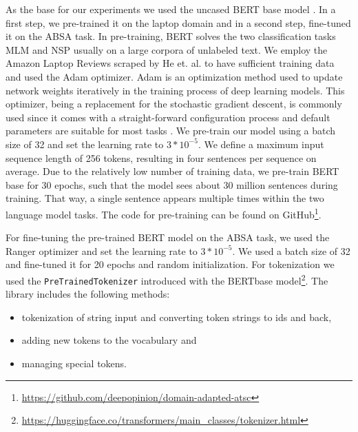 As the base for our experiments we used the uncased BERT base model \cite{DBLP:journals/corr/abs-1810-04805}. In a first step, we pre-trained it on the laptop domain and in a second step, fine-tuned it on the ABSA task. In pre-training, BERT solves the two classification tasks MLM and NSP usually on a large corpora of unlabeled text. We employ the Amazon Laptop Reviews scraped by He et. al. to have sufficient training data \cite{he2016ups} and used the Adam optimizer. Adam is an optimization method used to update network weights iteratively in the training process of deep learning models. This optimizer, being a replacement for the stochastic gradient descent, is commonly used since it comes with a straight-forward configuration process and default parameters are suitable for most tasks \cite{kingma2014adam}. We pre-train our model using a batch size of 32 and set the learning rate to $3 * 10^{-5}$.
We define a maximum input sequence length of 256 tokens, resulting in four sentences per sequence on average.  Due to the relatively low number of training data, we pre-train BERT base for 30 epochs, such that the model sees about 30 million sentences during training. That way, a single sentence appears multiple times within the two language model tasks. The code for pre-training can be found on GitHub\footnote{\url{https://github.com/deepopinion/domain-adapted-atsc}}.

For fine-tuning the pre-trained BERT model on the ABSA task, we used the Ranger optimizer and set the learning rate to $3 * 10^{-5}$.  We used a batch size of 32 and fine-tuned it for 20 epochs and random initialization. 
For tokenization we used the \texttt{PreTrainedTokenizer} introduced with the BERTbase model\footnote{\url{https://huggingface.co/transformers/main\_classes/tokenizer.html}}. The library includes the following methods:
\begin{itemize}
\item tokenization of string input and converting token strings to ids and back,
\item adding new tokens to the vocabulary and
\item managing special tokens.
\end{itemize}


